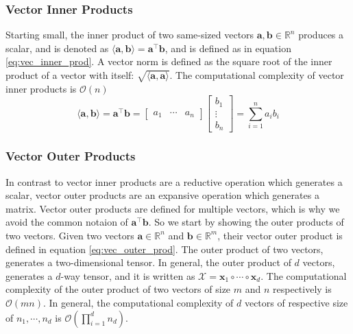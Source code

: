     \subsubsection{Vector Inner Products} \label{sec:Vector Inner Products}
        Starting small, the inner product of two same-sized vectors $\mathbf{a,
        b} \in \mathbb{R}^n$ produces a scalar, and is denoted as $\langle
        \mathbf{a, b}\rangle = \mathbf{a}^\intercal \mathbf{b}$, and is defined
        as in equation \ref{eq:vec_inner_prod}. A vector norm is defined as the
        square root of the inner product of a vector with itself: $\sqrt{\langle
        \mathbf{a, a} \rangle}$. The computational complexity of vector inner
        products is $\mathcal{O}(n)$
        \begin{equation} \label{eq:vec_inner_prod}
            \langle \mathbf{a, b} \rangle = \mathbf{a}^\intercal \mathbf{b} = 
            \left[
                \begin{array}{ccc}
                    a_1 & \cdots & a_n
                \end{array} 
            \right]
            \left[
                \begin{array}{c}
                    b_1 \\
                    \vdots \\
                    b_n
                \end{array} 
            \right]
            =
            \sum_{i = 1}^{n} a_ib_i
        \end{equation}
    

    \subsubsection{Vector Outer Products} \label{sec:Vector Outer Products}
        In contrast to vector inner products are a reductive operation which
        generates a scalar, vector outer products are an expansive operation
        which generates a matrix. Vector outer products are defined for multiple
        vectors, which is why we avoid the common notaion of
        $\mathbf{a}^\intercal\mathbf{b}$. So we start by showing the outer
        products of two vectors. Given two vectors $\mathbf{a}\in \mathbb{R}^n$
        and $\mathbf{b}\in \mathbb{R}^m$, their vector outer product is defined
        in equation \ref{eq:vec_outer_prod}. The outer product of two vectors,
        generates a two-dimensional tensor. In general, the outer product of $d$
        vectors, generates a $d$-way tensor, and it is written as $\mathcal{X} =
        \mathbf{x}_1 \circ \cdots \circ \mathbf{x}_d$. The computational
        complexity of the outer product of two vectors of size $m$ and $n$
        respectively is $\mathcal{O}(mn)$. In general, the computational
        complexity of $d$ vectors of respective size of $n_1, \cdots, n_d$ is
        $\mathcal{O}(\prod_{i=1}^{d} n_d)$.

